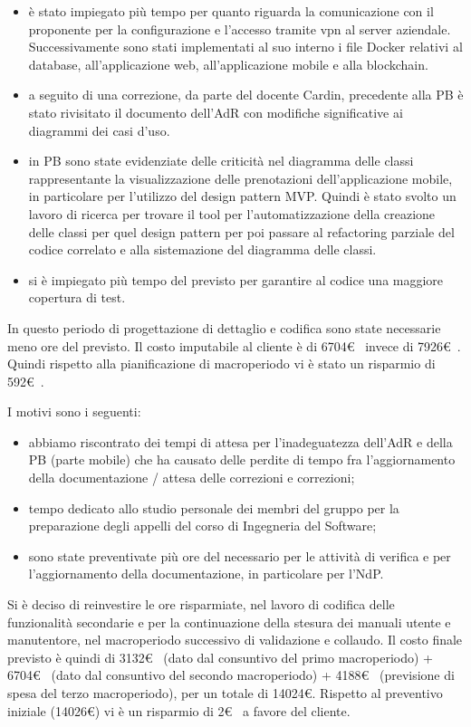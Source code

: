 \begin{itemize}
	\item è stato impiegato più tempo per quanto riguarda la comunicazione con il proponente per la configurazione e l'accesso tramite vpn al server aziendale. Successivamente sono stati implementati al suo interno i file Docker relativi al database, all'applicazione web, all'applicazione mobile e alla blockchain.
	\item a seguito di una correzione, da parte del docente Cardin, precedente alla PB è stato rivisitato 
	il documento dell'AdR con modifiche significative ai diagrammi dei casi d'uso.	
	\item in PB sono state evidenziate delle criticità nel diagramma delle classi rappresentante la visualizzazione delle prenotazioni dell'applicazione mobile, in particolare per l'utilizzo del design pattern MVP. Quindi è stato svolto un lavoro di ricerca per trovare il tool per l'automatizzazione della creazione delle classi per
	quel design pattern per poi passare al refactoring parziale del codice correlato e alla sistemazione del diagramma delle classi.
	\item si è impiegato più tempo del previsto per garantire al codice una maggiore copertura di test.
\end{itemize}

In questo periodo di progettazione di dettaglio e codifica sono state necessarie meno ore del previsto. Il costo imputabile al cliente è di 6704\euro~ invece di 7926\euro~.
Quindi rispetto alla pianificazione di macroperiodo vi è stato un risparmio di 592\euro~.

I motivi sono i seguenti:
\begin{itemize}
	\item abbiamo riscontrato dei tempi di attesa per l'inadeguatezza dell'AdR e della PB (parte mobile) che ha causato delle perdite di tempo fra l'aggiornamento della documentazione / attesa delle correzioni e correzioni;
	\item tempo dedicato allo studio personale dei membri del gruppo per la preparazione degli appelli del corso di Ingegneria del Software;
	\item sono state preventivate più ore del necessario per le attività di verifica e per l’aggiornamento della documentazione, in particolare per l'NdP.
\end{itemize}

Si è deciso di reinvestire le ore risparmiate, nel lavoro di codifica delle funzionalità secondarie e per la continuazione della stesura dei manuali utente e manutentore, nel macroperiodo successivo di validazione e collaudo.
Il costo finale previsto è quindi di 3132\euro~ (dato dal consuntivo del primo macroperiodo) + 6704\euro~ (dato dal consuntivo del secondo macroperiodo) + 4188\euro~ (previsione di spesa del terzo macroperiodo), per un totale di 14024\euro.
Rispetto al preventivo iniziale (14026\euro) vi è un risparmio di 2\euro~ a favore del cliente.

